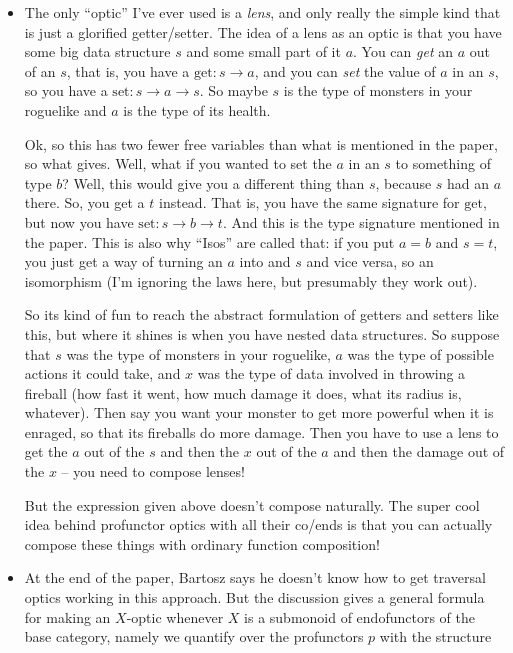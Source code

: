 \documentclass{amsart}
\begin{document}
\begin{itemize}
\item The only ``optic'' I've ever used is a \emph{lens}, and only really the
  simple kind that is just a glorified getter/setter. The idea of a lens as an
  optic is that you have some big data structure $s$ and some small part of it
  $a$. You can \emph{get} an $a$ out of an $s$, that is, you have a $\text{get}
  : s \to a$, and you can \emph{set} the value of $a$ in an $s$, so you have a
  $\text{set} : s \to a \to s$. So maybe $s$ is the type of monsters in your
  roguelike and $a$ is the type of its health.

  Ok, so this has two fewer free variables than what is mentioned in the paper,
  so what gives. Well, what if you wanted to set the $a$ in an $s$ to something
  of type $b$? Well, this would give you a different thing than $s$, because $s$
  had an $a$ there. So, you get a $t$ instead. That is, you have the same
  signature for $\text{get}$, but now you have $\text{set} : s \to b \to t$. And
  this is the type signature mentioned in the paper. This is also why ``Isos''
  are called that: if you put $a = b$ and $s = t$, you just get a way of turning
  an $a$ into and $s$ and vice versa, so an isomorphism (I'm ignoring the laws
  here, but presumably they work out).

  So its kind of fun to reach the abstract formulation of getters and setters
  like this, but where it shines is when you have nested data structures. So
  suppose that $s$ was the type of monsters in your roguelike, $a$ was the type
  of possible actions it could take, and $x$ was the type of data involved in
  throwing a fireball (how fast it went, how much damage it does, what its
  radius is, whatever). Then say you want your monster to get more powerful when
  it is enraged, so that its fireballs do more damage. Then you have to use a
  lens to get the $a$ out of the $s$ and then the $x$ out of the $a$ and then
  the damage out of the $x$ -- you need to compose lenses!

  But the expression given above doesn't compose naturally. The super cool idea
  behind profunctor optics with all their co/ends is that you can actually
  compose these things with ordinary function composition!

  \item At the end of the paper, Bartosz says he doesn't know how to get
    traversal optics working in this approach. But the discussion gives a
    general formula for making an $X$-optic whenever $X$ is a submonoid of
    endofunctors of the base category, namely we quantify over the profunctors
    $p$ with the structure


\end{itemize}
\end{document}
